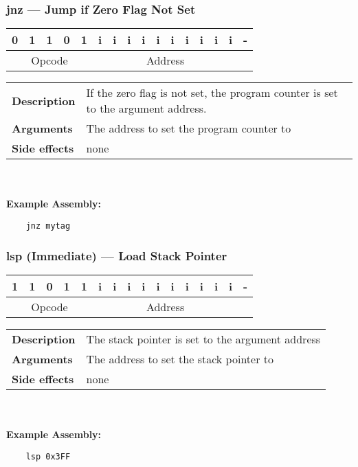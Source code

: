 \documentclass[titlepage]{article}
\begin{document}
\subsubsection{jnz --- Jump if Zero Flag Not Set}\begin{center}
\begin{tabular}{|c|c|c|c|c|c|c|c|c|c|c|c|c|c|c|c|}
\hline
0 & 1 & 1 & 0 & 1 & i & i & i & i & i & i & i & i & i & i & - \\
\hline
\multicolumn{5}{|c}{Opcode} &
\multicolumn{10}{|c}{Address} &
\multicolumn{1}{|c|}{} \\
\hline
\end{tabular}
\end{center}

\begin{tabular}{l p{8cm}}
{\bf Description} & If the zero flag is not set, the program counter is set to the argument address. \\
{\bf Arguments} & The address to set the program counter to \\
{\bf Side effects} & none \\
\end{tabular}\\ \\
{\bf Example Assembly:}
\begin{verbatim}
    jnz mytag
\end{verbatim}

\subsubsection{lsp (Immediate) --- Load Stack Pointer}\begin{center}
\begin{tabular}{|c|c|c|c|c|c|c|c|c|c|c|c|c|c|c|c|}
\hline
1 & 1 & 0 & 1 & 1 & i & i & i & i & i & i & i & i & i & i & - \\
\hline
\multicolumn{5}{|c}{Opcode} &
\multicolumn{10}{|c}{Address} &
\multicolumn{1}{|c|}{} \\
\hline
\end{tabular}
\end{center}

\begin{tabular}{l p{8cm}}
{\bf Description} & The stack pointer is set to the argument address \\
{\bf Arguments} & The address to set the stack pointer to \\
{\bf Side effects} & none \\
\end{tabular}\\ \\
{\bf Example Assembly:}
\begin{verbatim}
    lsp 0x3FF
\end{verbatim}
\end{document}
